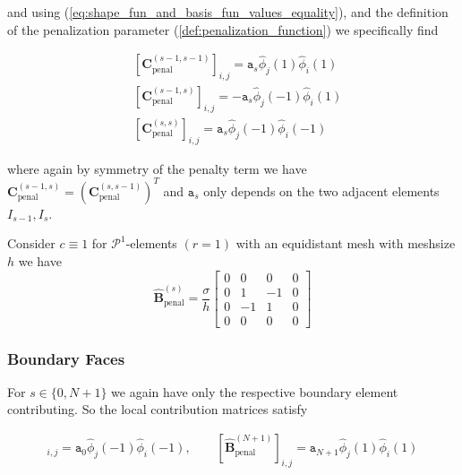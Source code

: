 and using (\ref{eq:shape_fun_and_basis_fun_values_equality}), and the definition of the penalization
parameter (\ref{def:penalization_function}) we specifically find

\begin{align*}
    &[\textbf{C}_{\text{penal}}^{(s-1,s-1)}]_{i,j} = \texttt{a}_s \widehat{\phi}_j(1) \widehat{\phi}_i(1)  \\
    &[\textbf{C}_{\text{penal}}^{(s-1,s)}]_{i,j} = -\texttt{a}_s \widehat{\phi}_j(-1) \widehat{\phi}_i(1) \\
    &[\textbf{C}_{\text{penal}}^{(s,s)}]_{i,j} = \texttt{a}_s \widehat{\phi}_j(-1) \widehat{\phi}_i(-1)
\end{align*}

where again by symmetry of the penalty term we have 
$ \textbf{C}_{\text{penal}}^{(s-1,s)} = (\textbf{C}_{\text{penal}}^{(s,s-1)})^T$
and $\texttt{a}_s$ only depends on the two adjacent elements $I_{s-1}, I_s$.

\begin{example}
    Consider $c\equiv 1$ for $\mathcal{P}^1$-elements $(r=1)$ 
    with an equidistant mesh with meshsize $h$ we have
    \begin{equation*}
        \widehat{\textbf{B}}_{\text{penal}}^{(s)} = \frac{\sigma}{h}
        \begin{bmatrix}
            0   & 0     & 0     & 0     \\
            0   & 1     & -1    & 0     \\
            0   & -1    & 1     & 0     \\
            0   & 0     & 0     & 0     
        \end{bmatrix}
    \end{equation*}    
\end{example}

\subsubsection{Boundary Faces}
For $s \in  \{0, N+1\} $ we again have only the respective boundary element contributing. 
So the local contribution matrices satisfy

\begin{align*}
    [\widehat{\textbf{B}}_{\text{penal}}^{(0)}]_{i,j} = 
    \texttt{a}_0 \widehat{\phi}_j(-1) \widehat{\phi}_i(-1), \qquad
    [\widehat{\textbf{B}}_{\text{penal}}^{(N+1)}]_{i,j} = 
    \texttt{a}_{N+1} \widehat{\phi}_j(1) \widehat{\phi}_i(1) \\
\end{align*}

